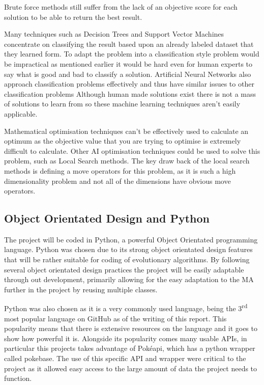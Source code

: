 \documentclass[a4paper]{article}
\newcommand{\Pokeapi}{Pok\'{e}api}
\begin{document}
Brute force methods still suffer from the lack of an objective score for each solution to be able to return the best result.
\par
Many techniques such as Decision Trees and Support Vector Machines concentrate on classifying the result based upon an already labeled dataset that they learned form.
To adapt the problem into a classification style problem would be impractical as mentioned earlier it would be hard even for human experts to say what is good and bad to classify a solution.
Artificial Neural Networks also approach classification problems effectively and thus have similar issues to other classification problems
Although human made solutions exist there is not a mass of solutions to learn from so these machine learning techniques aren't easily applicable.
\par
Mathematical optimisation techniques can't be effectively used to calculate an optimum as the objective value that you are trying to optimise is extremely difficult to calculate.
Other AI optimisation techniques could be used to solve this problem, such as Local Search methods.
The key draw back of the local search methods is defining a move operators for this problem, as it is such a high dimensionality problem and not all of the dimensions have obvious move operators.
\subsection{Object Orientated Design and Python}
The project will be coded in Python, a powerful Object Orientated programming language.
Python was chosen due to its strong object orientated design features that will be rather suitable for coding of evolutionary algorithms.
By following several object orientated design practices the project will be easily adaptable through out development, primarily allowing for the easy adaptation to the MA further in the project by reusing multiple classes.
\par
Python was also chosen as it is a very commonly used language, being the 3\textsuperscript{rd} most popular language on GitHub\cite{GitHut} as of the writing of this report.
This popularity means that there is extensive resources on the language and it goes to show how powerful it is.
Alongside its popularity comes many usable APIs, in particular this projects takes advantage of \Pokeapi{}, which has a python wrapper called pokebase. The use of this specific API and wrapper were critical to the project as it allowed easy access to the large amount of data the project needs to function.
\end{document}
